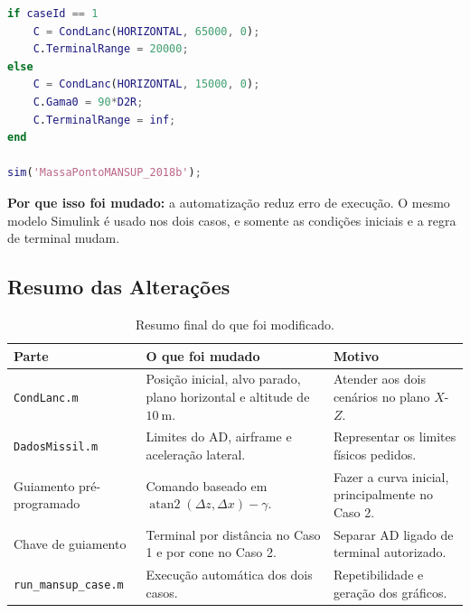 \begin{lstlisting}[language=Matlab]
if caseId == 1
    C = CondLanc(HORIZONTAL, 65000, 0);
    C.TerminalRange = 20000;
else
    C = CondLanc(HORIZONTAL, 15000, 0);
    C.Gama0 = 90*D2R;
    C.TerminalRange = inf;
end

sim('MassaPontoMANSUP_2018b');
\end{lstlisting}

\textbf{Por que isso foi mudado:} a automatiza\c{c}\~ao reduz erro de execu\c{c}\~ao. O mesmo modelo Simulink \'e usado nos dois casos, e somente as condi\c{c}\~oes iniciais e a regra de terminal mudam.

\subsection{Resumo das Altera\c{c}\~oes}

\begin{table}[H]
\centering
\caption{Resumo final do que foi modificado.}
\begin{tabular}{p{}p{}p{}}
\toprule
Parte & O que foi mudado & Motivo \\
\midrule
\texttt{CondLanc.m} & Posi\c{c}\~ao inicial, alvo parado, plano horizontal e altitude de \(10~\text{m}\). & Atender aos dois cen\'arios no plano \(X\)-\(Z\). \\
\texttt{DadosMissil.m} & Limites do AD, airframe e acelera\c{c}\~ao lateral. & Representar os limites f\'isicos pedidos. \\
Guiamento pr\'e-programado & Comando baseado em \(\operatorname{atan2}(\Delta z,\Delta x)-\gamma\). & Fazer a curva inicial, principalmente no Caso 2. \\
Chave de guiamento & Terminal por dist\^ancia no Caso 1 e por cone no Caso 2. & Separar AD ligado de terminal autorizado. \\
\texttt{run\_mansup\_case.m} & Execu\c{c}\~ao autom\'atica dos dois casos. & Repetibilidade e gera\c{c}\~ao dos gr\'aficos. \\
\bottomrule
\end{tabular}
\end{table}
